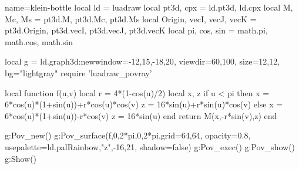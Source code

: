 \documentclass{standalone}
\begin{document}
\begin{luadraw}{name=klein-bottle}
local ld = luadraw
local pt3d, cpx = ld.pt3d, ld.cpx
local M, Mc, Ms = pt3d.M, pt3d.Mc, pt3d.Ms
local Origin, vecI, vecJ, vecK = pt3d.Origin, pt3d.vecI, pt3d.vecJ, pt3d.vecK
local pi, cos, sin = math.pi, math.cos, math.sin

local g = ld.graph3d:new{window={-12,15,-18,20}, viewdir={60,100}, size={12,12}, bg="lightgray" }
require 'luadraw_povray'

local function f(u,v)
    local r = 4*(1-cos(u)/2)
    local x, z
    if u < pi then
        x = 6*cos(u)*(1+sin(u))+r*cos(u)*cos(v)
        z = 16*sin(u)+r*sin(u)*cos(v)
    else
        x = 6*cos(u)*(1+sin(u))-r*cos(v)
        z = 16*sin(u)
    end
    return M(x,-r*sin(v),z)
end

g:Pov_new()
g:Pov_surface(f,0,2*pi,0,2*pi,{grid={64,64}, opacity=0.8,
   usepalette={ld.palRainbow,"z",{-16,21}}, shadow=false})
g:Pov_exec()
g:Pov_show()
g:Show()
\end{luadraw}
\end{document}
